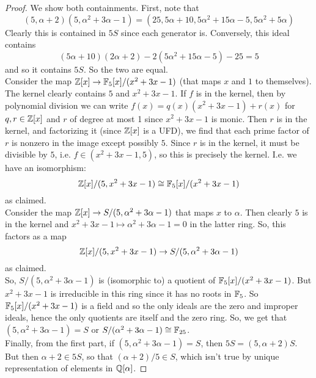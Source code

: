 \begin{proof}
	We show both containments. First, note that
	\[ (5,\alpha+2)(5,\alpha^2+3\alpha-1) = (25,5\alpha+10,5\alpha^2+15\alpha-5,5\alpha^2+5\alpha) \]
	Clearly this is contained in $5S$ since each generator is. Conversely, this ideal contains
	\[ (5\alpha+10)(2\alpha+2) - 2(5\alpha^2+15\alpha-5) - 25 = 5 \]
	and so it contains $5S$. So the two are equal. \\
	
	Consider the map $\mathbb{Z}[x] \to \mathbb{F}_5[x]/(x^2+3x-1)$ (that maps $x$ and $1$ to themselves). The kernel clearly contains $5$ and $x^2+3x-1$. If $f$ is in the kernel, then by polynomial division we can write $f(x) = q(x)(x^2+3x-1)+r(x)$ for $q,r \in \mathbb{Z}[x]$ and $r$ of degree at most 1 since $x^2+3x-1$ is monic. Then $r$ is in the kernel, and factorizing it (since $\mathbb{Z}[x]$ is a UFD), we find that each prime factor of $r$ is nonzero in the image except possibly $5$. Since $r$ is in the kernel, it must be divisible by $5$, i.e. $f \in (x^2+3x-1,5)$, so this is precisely the kernel. I.e. we have an isomorphism:
	\[ \mathbb{Z}[x]/(5,x^2+3x-1) \cong \mathbb{F}_5[x]/(x^2+3x-1) \]
	as claimed. \\
	
	Consider the map $\mathbb{Z}[x] \to S/(5,\alpha^2+3\alpha-1)$ that maps $x$ to $\alpha$. Then clearly $5$ is in the kernel and $x^2+3x-1 \mapsto \alpha^2+3\alpha-1 = 0$ in the latter ring. So, this factors as a map
	\[ \mathbb{Z}[x]/(5,x^2+3x-1) \to S/(5,\alpha^2+3\alpha-1) \]
	as claimed. \\
	
	So, $S/(5,\alpha^2+3\alpha-1)$ is (isomorphic to) a quotient of $\mathbb{F}_5[x]/(x^2+3x-1)$. But $x^2+3x-1$ is irreducible in this ring since it has no roots in $\mathbb{F}_5$. So $\mathbb{F}_5[x]/(x^2+3x-1)$ is a field and so the only ideals are the zero and improper ideals, hence the only quotients are itself and the zero ring. So, we get that $(5,\alpha^2+3\alpha-1) = S$ or $S/(\alpha^2+3\alpha-1) \cong \mathbb{F}_{25}$. \\
	
	Finally, from the first part, if $(5,\alpha^2+3\alpha-1) = S$, then $5S = (5,\alpha+2)S$. But then $\alpha+2 \in 5S$, so that $(\alpha+2)/5 \in S$, which isn't true by unique representation of elements in $\mathbb{Q}[\alpha]$.
\end{proof}
